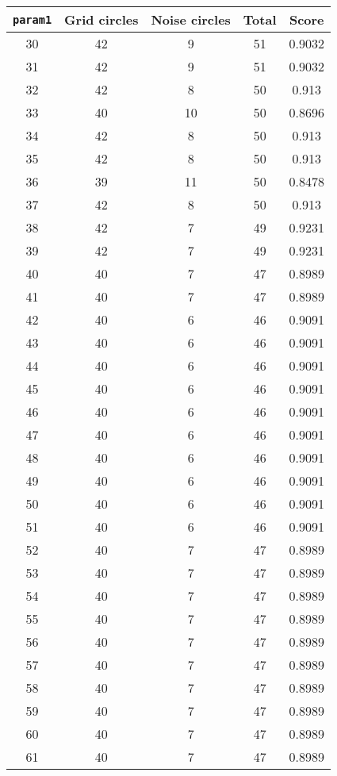 \documentclass[letterpaper, 12pt]{article}
\begin{document}
\begin{longtable}{|c|c|c|c|c|}
\hline
\textbf{\texttt{param1}} & \textbf{Grid circles} & \textbf{Noise circles} & \textbf{Total} & \textbf{Score} \\
\hline
30 & 42 & 9 & 51 & 0.9032 \\
\hline
31 & 42 & 9 & 51 & 0.9032 \\
\hline
32 & 42 & 8 & 50 & 0.913 \\
\hline
33 & 40 & 10 & 50 & 0.8696 \\
\hline
34 & 42 & 8 & 50 & 0.913 \\
\hline
35 & 42 & 8 & 50 & 0.913 \\
\hline
36 & 39 & 11 & 50 & 0.8478 \\
\hline
37 & 42 & 8 & 50 & 0.913 \\
\hline
38 & 42 & 7 & 49 & 0.9231 \\
\hline
39 & 42 & 7 & 49 & 0.9231 \\
\hline
40 & 40 & 7 & 47 & 0.8989 \\
\hline
41 & 40 & 7 & 47 & 0.8989 \\
\hline
42 & 40 & 6 & 46 & 0.9091 \\
\hline
43 & 40 & 6 & 46 & 0.9091 \\
\hline
44 & 40 & 6 & 46 & 0.9091 \\
\hline
45 & 40 & 6 & 46 & 0.9091 \\
\hline
46 & 40 & 6 & 46 & 0.9091 \\
\hline
47 & 40 & 6 & 46 & 0.9091 \\
\hline
48 & 40 & 6 & 46 & 0.9091 \\
\hline
49 & 40 & 6 & 46 & 0.9091 \\
\hline
50 & 40 & 6 & 46 & 0.9091 \\
\hline
51 & 40 & 6 & 46 & 0.9091 \\
\hline
52 & 40 & 7 & 47 & 0.8989 \\
\hline
53 & 40 & 7 & 47 & 0.8989 \\
\hline
54 & 40 & 7 & 47 & 0.8989 \\
\hline
55 & 40 & 7 & 47 & 0.8989 \\
\hline
56 & 40 & 7 & 47 & 0.8989 \\
\hline
57 & 40 & 7 & 47 & 0.8989 \\
\hline
58 & 40 & 7 & 47 & 0.8989 \\
\hline
59 & 40 & 7 & 47 & 0.8989 \\
\hline
60 & 40 & 7 & 47 & 0.8989 \\
\hline
61 & 40 & 7 & 47 & 0.8989 \\

\end{longtable}
\end{document}
